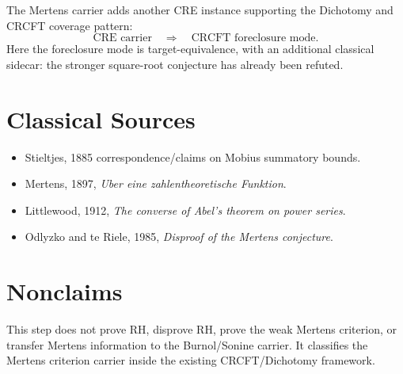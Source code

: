 \documentclass[11pt]{article}
\begin{document}
The Mertens carrier adds another CRE instance supporting the Dichotomy and
CRCFT coverage pattern:
\[
  \text{CRE carrier}\quad\Rightarrow\quad
  \text{CRCFT foreclosure mode}.
\]
Here the foreclosure mode is target-equivalence, with an additional classical
sidecar: the stronger square-root conjecture has already been refuted.

\section*{Classical Sources}

\begin{itemize}
\item Stieltjes, 1885 correspondence/claims on Mobius summatory bounds.
\item Mertens, 1897, \emph{Uber eine zahlentheoretische Funktion}.
\item Littlewood, 1912, \emph{The converse of Abel's theorem on power series}.
\item Odlyzko and te Riele, 1985, \emph{Disproof of the Mertens conjecture}.
\end{itemize}

\section*{Nonclaims}

This step does not prove RH, disprove RH, prove the weak Mertens criterion, or
transfer Mertens information to the Burnol/Sonine carrier.  It classifies the
Mertens criterion carrier inside the existing CRCFT/Dichotomy framework.
\end{document}

